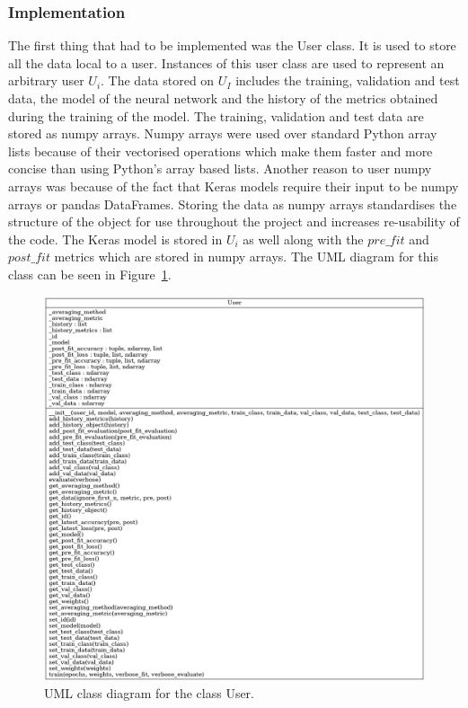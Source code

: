 \documentclass[12pt]{article}
\begin{document}
\subsubsection{Implementation}
The first thing that had to be implemented was the User class. It is used to store all the data local to a user. Instances of this user class are used to represent an arbitrary user $U_i$. The data stored on $U_I$ includes the training, validation and test data, the model of the neural network and the history of the metrics obtained during the training of the model. The training, validation and test data are stored as numpy arrays. Numpy arrays were used over standard Python array lists because of their vectorised operations which make them faster and more concise than using Python's array based lists. Another reason to user numpy arrays was because of the fact that Keras models require their input to be numpy arrays or pandas DataFrames. Storing the data as numpy arrays standardises the structure of the object for use throughout the project and increases re-usability of the code. The Keras model is stored in $U_i$ as well along with the $pre\_fit$ and $post\_fit$ metrics which are stored in numpy arrays. The UML diagram for this class can be seen in Figure~\ref{fig:classes_user}. 
\begin{figure}[H]
	\centering
	\includegraphics[width=\linewidth]{resources/classes_User.png}
	\caption{UML class diagram for the class User.}
	\label{fig:classes_user}
\end{figure}
\end{document}
